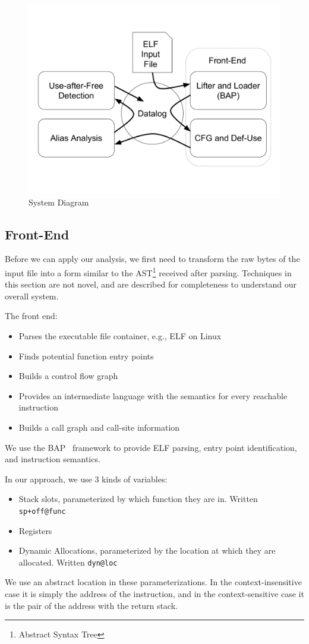 \begin{figure}
	\centering\includegraphics[scale=0.3]{alias/system.pdf}
	\caption{System Diagram}
	\label{fig:system}
\end{figure}

\subsection{Front-End}
Before we can apply our analysis, we first need to transform the raw
bytes of the input file into a form similar to the AST\footnote{Abstract Syntax Tree} received after
parsing.  Techniques in this section are not novel, and are described
for completeness to understand our overall system.

The front end:
\begin{itemize}
  \item Parses the executable file container, e.g., ELF on Linux
  \item Finds potential function entry points
  \item Builds a control flow graph
  \item Provides an intermediate language with the semantics for every reachable instruction
  \item Builds a call graph and call-site information
\end{itemize}

We use the BAP~\cite{bap} framework to provide ELF parsing, entry point identification, and instruction semantics.

In our approach, we use 3 kinds of variables:
\begin{itemize}
	\item Stack slots, parameterized by which function they are in. Written \texttt{sp+off@func}
	\item Registers
	\item Dynamic Allocations, parameterized by the location at which they are allocated. Written \texttt{dyn@loc}
\end{itemize}
We use an abstract location in these parameterizations.
In the context-insensitive case it is simply the address of the instruction, and in the context-sensitive case it is the pair of the address with the return stack.

